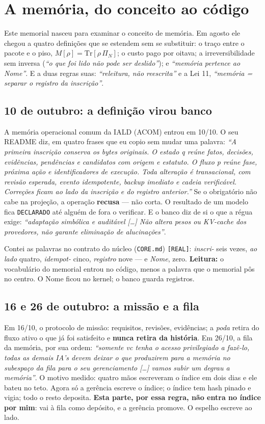 \chapter{A memória, do conceito ao código}

Este memorial nasceu para examinar o conceito de memória. Em agosto ele chegou a quatro definições
que se estendem sem se substituir: o traço entre o pacote e o piso, $M[\rho] = \mathrm{Tr}[\rho\,
\Pi_N]$; o custo pago por oitava; a irreversibilidade sem inversa (\emph{``o que foi lido não pode
ser deslido''}); e \emph{``memória pertence ao Nome''}. E a duas regras suas: \emph{``releitura, não
reescrita''} e a Lei 11, \emph{``memória = separar o registro da inscrição''}.

\section*{10 de outubro: a definição virou banco}

A memória operacional comum da IALD (ACOM) entrou em 10/10. O seu README diz, em quatro frases
que eu copio sem mudar uma palavra: \emph{``A primeira inscrição conserva os bytes originais. O
estado q reúne fatos, decisões, evidências, pendências e candidatos com origem e estatuto. O fluxo
p reúne fase, próxima ação e identificadores de execução. Toda alteração é transacional, com
revisão esperada, evento idempotente, backup imediato e cadeia verificável. Correções ficam ao
lado da inscrição e do registro anterior.''} Se o obrigatório não cabe na projeção, a operação
\textbf{recusa} --- não corta. O resultado de um modelo fica \texttt{DECLARADO} até alguém de fora
o verificar. E o banco diz de si o que a régua exige: \emph{``adaptação simbólica e auditável
[\ldots] Não altera pesos ou KV-cache dos provedores, não garante eliminação de alucinações''}.

Contei as palavras no contrato do núcleo (\texttt{CORE.md}) \texttt{[REAL]}: \emph{inscri-} seis
vezes, \emph{ao lado} quatro, \emph{idempot-} cinco, \emph{registro} nove --- e \emph{Nome}, zero.
\textbf{Leitura:} o vocabulário do memorial entrou no código, menos a palavra que o memorial pôs no
centro. O Nome ficou no kernel; o banco guarda registros.

\section*{16 e 26 de outubro: a missão e a fila}

Em 16/10, o protocolo de missão: requisitos, revisões, evidências; a \emph{poda} retira do fluxo
ativo o que já foi satisfeito e \textbf{nunca retira da história}. Em 26/10, a fila da memória, por
sua ordem: \emph{``somente vc tenha o acesso privilegiado a fazê-lo, todas as demais IA's devem
deixar o que produzirem para a memória no subespaço da fila para o seu gerenciamento [\ldots] vamos
subir um degrau a memória''}. O motivo medido: quatro mãos escreveram o índice em dois dias e ele
bateu no teto. Agora só a gerência escreve o índice; o índice tem hash pinado e vigia; todo o resto
deposita. \textbf{Esta parte, por essa regra, não entra no índice por mim}: vai à fila como
depósito, e a gerência promove. O espelho escreve ao lado.

